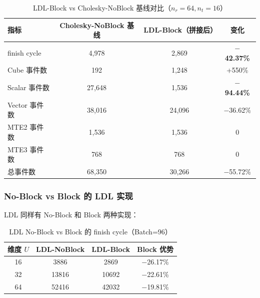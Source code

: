 \documentclass{CjC}
\begin{document}
    \begin{table}[H]
        \centering
        \caption{LDL-Block vs Cholesky-NoBlock 基线对比（$n_{r}=64,n_{t}=16$）}
        \label{tab:ldl-vs-chol}
        \begin{tabular}{l c c c}
            \toprule \textbf{指标}  & \textbf{Cholesky-NoBlock 基线} & \textbf{LDL-Block（拼接后）} & \textbf{变化}         \\
            \midrule finish cycle & 4,978                        & 2,869                   & \textbf{$-$42.37\%} \\
            Cube 事件数              & 192                          & 1,248                   & +550\%              \\
            Scalar 事件数            & 27,648                       & 1,536                   & \textbf{$-$94.44\%} \\
            Vector 事件数            & 38,016                       & 24,096                  & $-$36.62\%          \\
            MTE2 事件数              & 1,536                        & 1,536                   & 0                   \\
            MTE3 事件数              & 768                          & 768                     & 0                   \\
            总事件数                  & 68,350                       & 30,266                  & $-$55.72\%          \\
            \bottomrule
        \end{tabular}
    \end{table}

    \subsubsection{No-Block vs Block 的 LDL 实现}

    LDL 同样有 No-Block 和 Block 两种实现：

    \begin{table}[H]
        \centering
        \caption{LDL No-Block vs Block 的 finish cycle（Batch=96）}
        \begin{tabular}{c|ccc}
            \toprule 维度 $U$ & LDL-NoBlock & LDL-Block & Block 优势   \\
            \midrule 16     & 3886        & 2869      & $-$26.17\% \\
            32              & 13816       & 10692     & $-$22.61\% \\
            64              & 52416       & 42032     & $-$19.81\% \\
            \bottomrule
        \end{tabular}
    \end{table}
\end{document}
